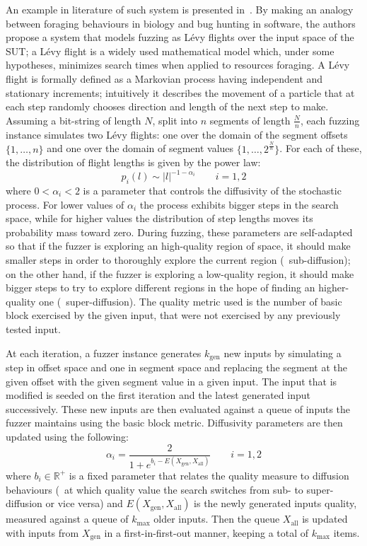 An example in literature of such system is presented
in~\cite{bottinger2016fuzzing, bottinger2016hunting}. By making an analogy
between foraging behaviours in biology and bug hunting in software, the authors
propose a system that models fuzzing as L\'evy flights over the input space of
the \ac{SUT}; a L\'evy flight is a widely used mathematical model which, under
some hypotheses, minimizes search times when applied to resources foraging. A
L\'evy flight is formally defined as a Markovian process having independent and
stationary increments; intuitively it describes the movement of a particle that
at each step randomly chooses direction and length of the next step to make.
Assuming a bit-string of length $N$, split into $n$ segments of length
$\frac{N}{n}$, each fuzzing instance simulates two L\'evy flights: one over the
domain of the segment offsets $\{1,\dots,n\}$ and one over the domain of segment
values $\{1,\dots,2^{\frac{N}{n}}\}$. For each of these, the distribution of
flight lengths is given by the power law:
$$p_i(l) \sim |l|^{-1 - \alpha_i} \qquad i = 1,2$$
where $0 < \alpha_i < 2$ is a parameter that controls the diffusivity of the
stochastic process. For lower values of $\alpha_i$ the process exhibits bigger
steps in the search space, while for higher values the distribution of step
lengths moves its probability mass toward zero. During fuzzing, these parameters
are self-adapted so that if the fuzzer is exploring an high-quality region of
space, it should make smaller steps in order to thoroughly explore the current
region (\ie~sub-diffusion); on the other hand, if the fuzzer is exploring a
low-quality region, it should make bigger steps to try to explore different
regions in the hope of finding an higher-quality one (\ie~super-diffusion). The
quality metric used is the number of basic block exercised by the given input,
that were not exercised by any previously tested input.

At each iteration, a fuzzer instance generates $k_\text{gen}$ new inputs by
simulating a step in offset space and one in segment space and replacing the
segment at the given offset with the given segment value in a given input. The
input that is modified is seeded on the first iteration and the latest generated
input successively. These new inputs are then evaluated against a queue of
inputs the fuzzer maintains using the basic block metric. Diffusivity parameters
are then updated using the following:
$$\alpha_i = \frac{2}{1 + e^{b_i - E(X_\text{gen}, X_\text{all})}}
\qquad i = 1,2$$
where $b_i \in \mathbb{R}^+$ is a fixed parameter that relates the quality
measure to diffusion behaviours (\ie~at which quality value the search switches
from sub- to super-diffusion or vice versa) and $E(X_\text{gen}, X_\text{all})$
is the newly generated inputs quality, measured against a queue of
$k_\text{max}$ older inputs. Then the queue $X_\text{all}$ is updated with
inputs from $X_\text{gen}$ in a first-in-first-out manner, keeping a total of
$k_\text{max}$ items.

